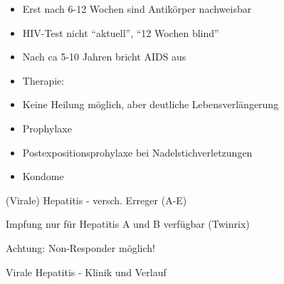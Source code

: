 \documentclass{article}
\begin{document}
\begin{itemize}
\item Erst nach 6-12 Wochen sind Antik\"orper nachweisbar

\end{itemize}
\begin{itemize}
\item HIV-Test nicht {\textquotedblleft}aktuell{\textquotedblright},
{\textquotedblleft}12 Wochen blind{\textquotedblright}

\end{itemize}
\begin{itemize}
\item Nach ca 5-10 Jahren bricht AIDS aus

\item Therapie:

\end{itemize}
\begin{itemize}
\item Keine Heilung m\"oglich, aber deutliche Lebensverl\"angerung

\end{itemize}
\begin{itemize}
\item Prophylaxe

\end{itemize}
\begin{itemize}
\item Postexpositionsprohylaxe bei Nadelstichverletzungen

\item Kondome

\end{itemize}
(Virale) Hepatitis - versch. Erreger (A-E)

Impfung nur f\"ur Hepatitis A und B verf\"ugbar
(Twinrix{\texttrademark})

Achtung: Non-Responder m\"oglich!

Virale Hepatitis - Klinik und Verlauf
\end{document}
